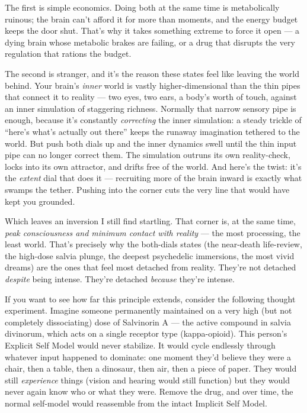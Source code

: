\documentclass[11pt, twoside, openright]{book}
\begin{document}
The first is simple economics. Doing both at the same time is metabolically ruinous; the brain can't afford it for more than moments, and the energy budget keeps the door shut. That's why it takes something extreme to force it open --- a dying brain whose metabolic brakes are failing, or a drug that disrupts the very regulation that rations the budget.

The second is stranger, and it's the reason these states feel like leaving the world behind. Your brain's \textit{inner} world is vastly higher-dimensional than the thin pipes that connect it to reality --- two eyes, two ears, a body's worth of touch, against an inner simulation of staggering richness. Normally that narrow sensory pipe is enough, because it's constantly \textit{correcting} the inner simulation: a steady trickle of ``here's what's actually out there'' keeps the runaway imagination tethered to the world. But push both dials up and the inner dynamics swell until the thin input pipe can no longer correct them. The simulation outruns its own reality-check, locks into its own attractor, and drifts free of the world. And here's the twist: it's the \textit{extent} dial that does it --- recruiting more of the brain inward is exactly what swamps the tether. Pushing into the corner cuts the very line that would have kept you grounded.

Which leaves an inversion I still find startling. That corner is, at the same time, \textit{peak consciousness and minimum contact with reality} --- the most processing, the least world. That's precisely why the both-dials states (the near-death life-review, the high-dose salvia plunge, the deepest psychedelic immersions, the most vivid dreams) are the ones that feel most detached from reality. They're not detached \textit{despite} being intense. They're detached \textit{because} they're intense.

If you want to see how far this principle extends, consider the following thought experiment. Imagine someone permanently maintained on a very high (but not completely dissociating) dose of Salvinorin A --- the active compound in salvia divinorum, which acts on a single receptor type (kappa-opioid). This person's Explicit Self Model would never stabilize. It would cycle endlessly through whatever input happened to dominate: one moment they'd believe they were a chair, then a table, then a dinosaur, then air, then a piece of paper. They would still \textit{experience} things (vision and hearing would still function) but they would never again know who or what they were. Remove the drug, and over time, the normal self-model would reassemble from the intact Implicit Self Model.
\end{document}
